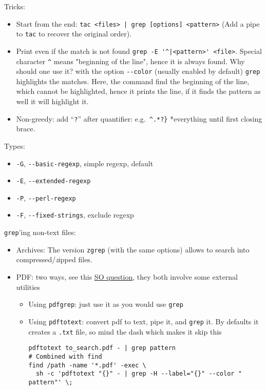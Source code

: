 \documentclass[a4paper,12pt,%
              final%
              ]{article}
\begin{document}
Tricks:
\begin{itemize}
  \item Start from the end: \verb!tac <files> | grep [options] <pattern>! (Add a pipe to \texttt{tac} to recover the original order).
  \item Print even if the match is not found \verb!grep -E '^|<pattern>' <file>!. Special character \verb|^| means "beginning of the line", hence it is always found. Why should one use it? with the option \verb|--color| (usually enabled by default) \verb|grep| highlights the matches. Here, the command find the beginning of the line, which cannot be highlighted, hence it prints the line, if it finds the pattern as well it will highlight it.
  \item Non-greedy: add ``\texttt{?}'' after quantifier: e.g.\ \verb|^.*?}| *everything until first closing brace.
\end{itemize}

Types:
\begin{itemize}
  \item \texttt{-G}, \verb|--basic-regexp|, simple regexp, default
  \item \texttt{-E}, \verb|--extended-regexp|
  \item \texttt{-P}, \verb|--perl-regexp|
  \item \texttt{-F}, \verb|--fixed-strings|, exclude regexp
\end{itemize}

\texttt{grep}'ing non-text files:
\begin{itemize}
  \item Archives: The version \texttt{zgrep} (with the same options) allows to search into compressed/\emph{z}ipped files.
  \item PDF: two ways, see this \href{https://unix.stackexchange.com/questions/6704/how-can-i-grep-in-pdf-files}{SO question}, they both involve some external utilities
    \begin{itemize}
      \item Using \texttt{pdfgrep}: just use it as you would use \texttt{grep}
      \item Using \texttt{pdftotext}: convert pdf to text, pipe it, and \texttt{grep} it. By defaults it creates a \texttt{.txt} file, so mind the dash which makes it skip this
\begin{verbatim}
pdftotext to_search.pdf - | grep pattern
# Combined with find
find /path -name '*.pdf' -exec \
  sh -c 'pdftotext "{}" - | grep -H --label="{}" --color " pattern"' \;
\end{verbatim}
    \end{itemize}
\end{itemize}
\end{document}
